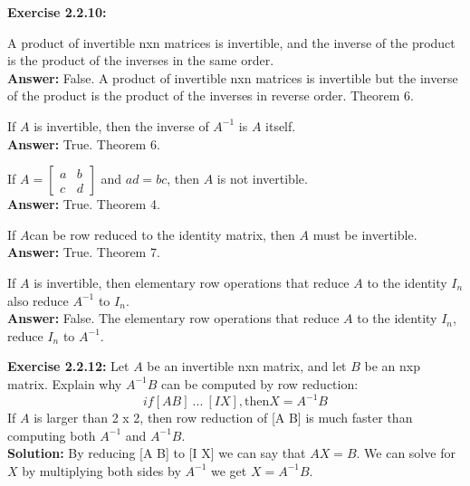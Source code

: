 \documentclass{amsart}
\begin{document}
\noindent\textbf{Exercise 2.2.10: }  \\
\begin{enumeration}
\item A product of invertible nxn matrices is invertible, and the inverse of the product is the product of the inverses in the same order.\\
\textbf{Answer: } False. A product of invertible nxn matrices is invertible but the inverse of the product is the product of the inverses in reverse order. Theorem 6.  
\vspace{1in}


\item If $A$ is invertible, then the inverse of $A^{-1}$ is $A$ itself.\\
\textbf{Answer: }True. Theorem 6.
\vspace{1in}

\item If $A = \begin{bmatrix}a&b\\ c&d \end{bmatrix}$ and $ad = bc$, then $A$ is not invertible.\\
\textbf{Answer: } True. Theorem 4.
\vspace{1in}

\item If $A$can be row reduced to the identity matrix, then $A$ must be invertible.\\
\textbf{Answer: }True. Theorem 7.
\vspace{1in}


\item If $A$ is invertible, then elementary row operations that reduce $A$ to the identity $I_{n}$ also reduce $A^{-1}$ to $I_{n}$.\\
\textbf{Answer: } False. The elementary row operations that reduce $A$ to the identity $I_{n}$, reduce $I_{n}$ to $A^{-1}$.
\vspace{1in}

\end{enumeration}

\noindent\textbf{Exercise 2.2.12: } Let $A$ be an invertible nxn matrix, and let $B$ be an nxp matrix. Explain why $A^{-1}B$ can be computed by row reduction:
\begin{equation}
if [A B]~...~[I X], \text{then} X = A^{-1}B
\end{equation}
If $A$ is larger than 2 x 2, then row reduction of [A B] is much faster than computing both $A^{-1}$ and $A^{-1}B$. \\
\noindent \textbf{Solution: } By reducing [A B] to [I X] we can say that $AX = B$. We can solve for $X$ by multiplying both sides by $A^{-1}$ we get $X=A^{-1}B$.   
\vspace{1in}
\end{document}

